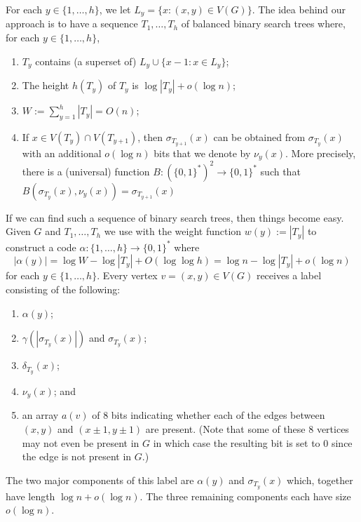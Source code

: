 \documentclass[kpfonts]{patmorin}
\begin{document}
For each $y\in\{1,\ldots,h\}$, we let $L_y=\{x:(x,y)\in V(G)\}$.  The idea behind our approach is to have a sequence $T_1,\ldots,T_h$ of balanced binary search trees where, for each $y\in\{1,\ldots,h\}$,
\begin{enumerate}[(PR1)]
  \item $T_y$ contains (a superset of) $L_y\cup \{x-1:x\in L_y\}$;
  \item The height $h(T_y)$ of $T_y$ is $\log |T_y| + o(\log n)$;
  \item $W:=\sum_{y=1}^h |T_y| = O(n)$;
  \item If $x\in V(T_y)\cap V(T_{y+1})$, then $\sigma_{T_{y+1}}(x)$ can be obtained from $\sigma_{T_{y}}(x)$ with an additional $o(\log n)$ bits that we denote by $\nu_y(x)$.  More precisely, there is a (universal) function $B:(\{0,1\}^*)^2\to\{0,1\}^*$ such that $B(\sigma_{T_{y}}(x), \nu_y(x))=\sigma_{T_{y+1}}(x)$
\end{enumerate}
If we can find such a sequence of binary search trees, then things become easy.  Given $G$ and $T_{1},\ldots,T_h$ we use  with the weight function $w(y):=|T_y|$ to construct a code $\alpha:\{1,\ldots,h\}\to\{0,1\}^*$ where
\[  
  |\alpha(y)| = \log W-\log|T_y| + O(\log\log h) = \log n - \log|T_y| + o(\log n)
\]
for each $y\in\{1,\ldots,h\}$.  Every vertex $v=(x,y)\in V(G)$ receives a label consisting of the following:
\begin{enumerate}
  \item $\alpha(y)$;
  \item $\gamma(|\sigma_{T_y}(x)|)$ and $\sigma_{T_y}(x)$;    
  \item $\delta_{T_y}(x)$;
  \item $\nu_y(x)$; and
  \item an array $a(v)$ of $8$ bits indicating whether each of the edges between $(x,y)$ and $(x\pm 1,y\pm 1)$ are present.  (Note that some of these 8 vertices may not even be present in $G$ in which case the resulting bit is set to 0 since the edge is not present in $G$.)
\end{enumerate}
The two major components of this label are $\alpha(y)$ and $\sigma_{T_y}(x)$ which, together have length $\log n + o(\log n)$.  The three remaining components each have size $o(\log n)$.
\end{document}
